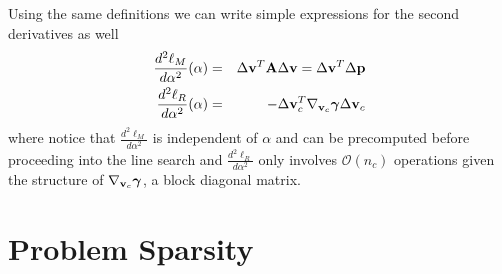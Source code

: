 Using the same definitions we can write simple expressions for the second
derivatives as well
\begin{eqnarray}
	\frac{d^2\ell_M}{d\alpha^2}(\alpha)&=&\Delta{\mathbf{v}}^T{\mathbf{A}}\Delta{\mathbf{v}}=\Delta{\mathbf{v}}^T\Delta{\mathbf{p}}\\
	\frac{d^2\ell_R}{d\alpha^2}(\alpha)&=&-\Delta{\mathbf{v}}_c^T
	\nabla_{{\mathbf{v}}_c}{\bm\gamma}\Delta{\mathbf{v}}_c
\end{eqnarray}
where notice that $\frac{d^2\ell_M}{d\alpha^2}$ is independent of $\alpha$ and
can be precomputed before proceeding into the line search and
$\frac{d^2\ell_R}{d\alpha^2}$ only involves $\mathcal{O}(n_c)$ operations given
the structure of $\nabla_{{\mathbf{v}}_c}{\bm\gamma}$, a block diagonal matrix.

\section{Problem Sparsity}

